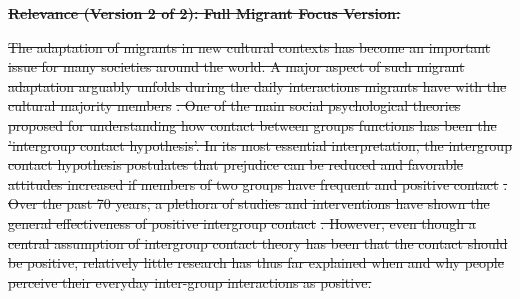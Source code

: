\documentclass[man, 12pt, a4paper, mask]{apa7} %
\theoremstyle{break}
\theoremstyle{plain}
\providecommand{\DIFdeltex}[1]{{\protect\color{red}\sout{#1}}}                      %
\providecommand{\DIFdelbegin}{} %
\providecommand{\DIFdelend}{} %
\providecommand{\DIFdel}[1]{\texorpdfstring{\DIFdeltex{#1}}{}} %
\newcommand{\DIFscaledelfig}{0.5}
\newlength{\DIFdelgraphicswidth} %
\newlength{\DIFdelgraphicsheight} %
\newcommand{\DIFdelincludegraphics}[2][]{%
\sbox{\DIFdelgraphicsbox}{\DIFOincludegraphics[#1]{#2}}%
\settoboxwidth{\DIFdelgraphicswidth}{\DIFdelgraphicsbox} %
\settoboxtotalheight{\DIFdelgraphicsheight}{\DIFdelgraphicsbox} %
\scalebox{\DIFscaledelfig}{%
\parbox[b]{\DIFdelgraphicswidth}{\usebox{\DIFdelgraphicsbox}\\[-\baselineskip] \rule{\DIFdelgraphicswidth}{0em}}\llap{\resizebox{\DIFdelgraphicswidth}{\DIFdelgraphicsheight}{%
\setlength{\unitlength}{\DIFdelgraphicswidth}%
\begin{picture}(1,1)%
\thicklines\linethickness{2pt} %
{\color[rgb]{1,0,0}\put(0,0){\framebox(1,1){}}}%
{\color[rgb]{1,0,0}\put(0,0){\line( 1,1){1}}}%
{\color[rgb]{1,0,0}\put(0,1){\line(1,-1){1}}}%
\end{picture}%
}\hspace*{3pt}}} %
} %
\DeclareRobustCommand{\DIFdelbegin}{\DIFOdelbegin \let\includegraphics\DIFdelincludegraphics} %
\DeclareRobustCommand{\DIFdelend}{\DIFOaddend \let\includegraphics\DIFOincludegraphics} %
\begin{document}
\DIFdelbegin \textbf{\DIFdel{Relevance (Version 2 of 2): Full Migrant Focus Version:}}
\DIFdelend %

\DIFdelbegin \DIFdel{The adaptation of migrants in new cultural contexts has become an important issue for many societies around the world. A major aspect of such migrant adaptation arguably unfolds during the daily interactions migrants have with the cultural majority members }%
\DIFdel{. One of the main social psychological theories proposed for understanding how contact between groups functions has been the ’intergroup contact hypothesis’. In its most essential interpretation, the intergroup contact hypothesis postulates that prejudice can be reduced and favorable attitudes increased if members of two groups have frequent and positive contact }%
\DIFdel{. Over the past 70 years, a plethora of studies and interventions have shown the general effectiveness of positive intergroup contact }%
\DIFdel{. However, even though a central assumption of intergroup contact theory has been that the contact should be positive, relatively little research has thus far explained when and why people perceive their everyday inter-group interactions as positive.
}%
\end{document}
